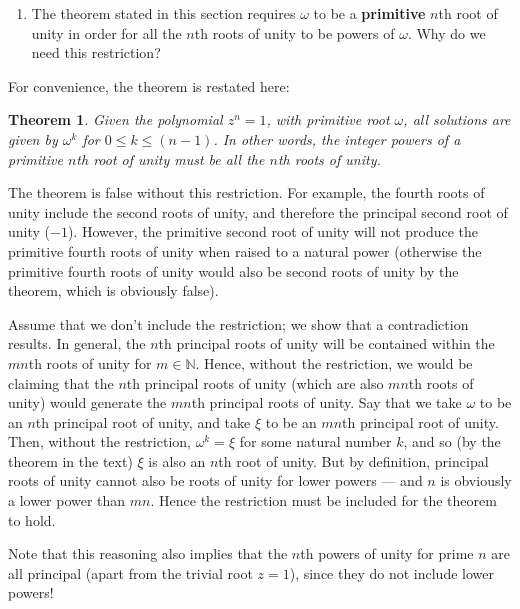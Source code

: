 \documentclass[a4paper,10pt]{article}
\newtheorem*{thm}{Theorem}
\newcommand{\answer}{\bfseries\color{Emerald}\refstepcounter{enumi}\item[\theenumi.]}
\begin{document}
\filbreak\begin{enumerate}[resume]
  \answer The theorem stated in this section requires $ \omega $ to be a \textbf{primitive} $ n$th root of unity
        in order for all the $ n$th roots of unity to be powers of $ \omega $. Why do we need this
        restriction?
\end{enumerate}

For convenience, the theorem is restated here:
\begin{thm}
  Given the polynomial $ z^n = 1 $, with primitive root $ \omega $, all solutions
  are given by $ \omega^k $ for $ 0 \leq k \leq (n - 1) $. In other words,
  the integer powers of a primitive $ n$th root of unity must be \emph{all} the
  $n$th roots of unity.
\end{thm}

The theorem is false without this restriction. For example, the fourth roots of unity include the second roots of unity, and
therefore the principal second root of unity ($-1$). However, the primitive second root of unity will not produce the primitive
fourth roots of unity when raised to a natural power (otherwise the primitive fourth roots of unity would also be second roots
of unity by the theorem, which is obviously false).

Assume that we don't include the restriction; we show that a contradiction results.
In general, the $ n$th principal roots of unity will be contained within the $ mn$th roots of unity for $ m \in \mathbb{N} $. Hence,
without the restriction, we would be claiming that the $ n$th principal roots of unity (which are also $ mn$th roots of unity)
would generate the $ mn$th principal roots of unity. Say that we take $ \omega $ to be an $ n$th principal root of unity,
and take $ \xi $ to be an $ mn$th principal root of unity. Then, without the restriction, $ \omega^k = \xi $ for
some natural number $ k $, and so (by the theorem in the text)  $\xi $ is also an $ n$th root of unity. But
by definition, principal roots of unity cannot also be roots of unity for lower powers --- and $ n $ is obviously
a lower power than $ mn $. Hence the restriction must be included for the theorem to hold.

Note that this reasoning also implies that the $ n$th powers of unity for prime $ n $ are all principal (apart from the trivial
root $ z = 1 $), since they do not include lower powers!
\end{document}

